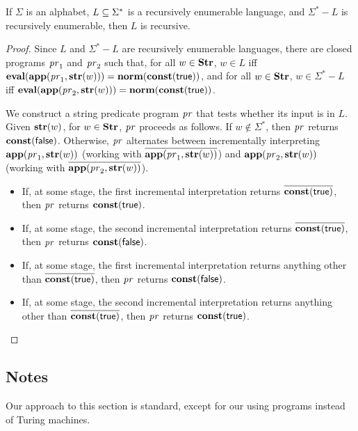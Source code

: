 \begin{theorem}
If $\Sigma$ is an alphabet, $L\subseteq\Sigma^*$ is a recursively
enumerable language, and $\Sigma^*-L$ is recursively enumerable, then
$L$ is recursive.
\end{theorem}

\begin{proof}
Since $L$ and $\Sigma^*-L$ are recursively enumerable languages,
there are closed programs $\mathit{pr}_1$ and $\mathit{pr}_2$ such that, for all $w\in\mathbf{Str}$,
$w\in L$ iff
$\mathbf{eval}(\mathbf{app}(\mathit{pr}_1,\mathbf{str}(w)))=\mathbf{norm}(\mathbf{const}(\mathsf{true}))$, and
for all $w\in\mathbf{Str}$, $w\in\Sigma^*-L$ iff
$\mathbf{eval}(\mathbf{app}(\mathit{pr}_2,\mathbf{str}(w)))=\mathbf{norm}(\mathbf{const}(\mathsf{true}))$.

We construct a string predicate program $\mathit{pr}$ that tests whether its
input is in $L$.  Given $\mathbf{str}(w)$, for $w\in\mathbf{Str}$, $\mathit{pr}$ proceeds
as follows.  If $w\not\in\Sigma^*$, then $\mathit{pr}$ returns
$\mathbf{const}(\mathsf{false})$.  Otherwise, $\mathit{pr}$ alternates between
incrementally interpreting $\mathbf{app}(\mathit{pr}_1,\mathbf{str}(w))$ (working with
$\overline{\mathbf{app}(\mathit{pr}_1,\mathbf{str}(w))}$) and
$\mathbf{app}(\mathit{pr}_2,\mathbf{str}(w))$ (working with
$\overline{\mathbf{app}(\mathit{pr}_2,\mathbf{str}(w))}$).

\begin{itemize}
\item If, at some stage, the first incremental interpretation returns
  $\overline{\mathbf{const}(\mathsf{true})}$, then $\mathit{pr}$ returns
  $\mathbf{const}(\mathsf{true})$.

\item If, at some stage, the second incremental interpretation returns
  $\overline{\mathbf{const}(\mathsf{true})}$, then $\mathit{pr}$ returns
  $\mathbf{const}(\mathsf{false})$.

\item If, at some stage, the first incremental interpretation returns
  anything other than $\overline{\mathbf{const}(\mathsf{true})}$, then $\mathit{pr}$
  returns $\mathbf{const}(\mathsf{false})$.

\item If, at some stage, the second incremental interpretation returns
  anything other than $\overline{\mathbf{const}(\mathsf{true})}$, then $\mathit{pr}$
  returns $\mathbf{const}(\mathsf{true})$.
\end{itemize}
\end{proof}

%

\subsection{Notes}

Our approach to this section is standard, except for our using
programs instead of Turing machines.

